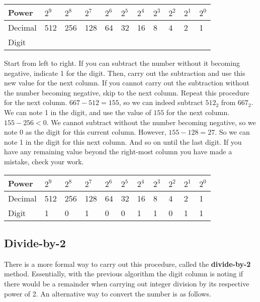 \vspace{1em} %
\begin{tabular}{|l|l|l|l|l|l|l|l|l|l|l|}\hline
Power & $2^9$ & $2^8$ & $2^7$ & $2^6$ & $2^5$ & $2^4$ & $2^3$ & $2^2$ & $2^1$ & $2^0$ \\\hline\hline
Decimal & 512 & 256 & 128 & 64 & 32 & 16 & 8 & 4 & 2 & 1 \\\hline
Digit &  &  &  &  &  &  &  &  &  &  \\\hline
\end{tabular}
\vspace{1em}

Start from left to right. If you can subtract the number without it becoming negative, indicate 1 for the digit. %
Then, carry out the subtraction and use this new value for the next column. If you cannot carry out the subtraction %
without the number becoming negative, skip to the next column. Repeat this procedure for the next column. %
$667-512=155$, so we can indeed subtract $512_2$ from $667_2$. We can note 1 in the digit, and use the value of $155$ %
for the next column. $155-256<0$. We cannot subtract without the number becoming negative, so we note 0 as the digit %
for this current column. However, $155-128=27$. So we can note 1 in the digit for this next column. And so on until %
the last digit. If you have any remaining value beyond the right-most column you have made a mistake, check your work. %

\vspace{1em} %
\begin{tabular}{|l|l|l|l|l|l|l|l|l|l|l|}\hline
Power & $2^9$ & $2^8$ & $2^7$ & $2^6$ & $2^5$ & $2^4$ & $2^3$ & $2^2$ & $2^1$ & $2^0$ \\\hline\hline
Decimal & 512 & 256 & 128 & 64 & 32 & 16 & 8 & 4 & 2 & 1 \\\hline
Digit & 1 & 0 & 1 & 0 & 0 & 1 & 1 & 0 & 1 & 1 \\\hline
\end{tabular}
\vspace{1em}

\subsection{Divide-by-2\label{sec:numbers:divideby2}}

There is a more formal way to carry out this procedure, called the \textbf{divide-by-2} method. Essentially, with the previous 
algorithm the digit column is noting if there would be a remainder when carrying out integer division by its respective power of 2. 
An alternative way to convert the number is as follows.

